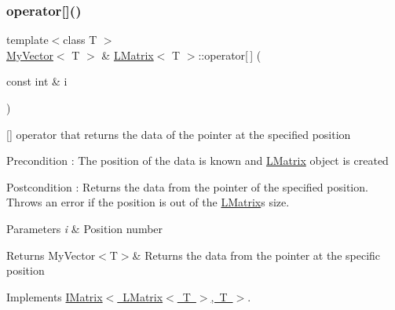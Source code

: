 \subsubsection{\texorpdfstring{operator[]()}{operator[]()}\hspace{0.1cm}{\footnotesize\ttfamily [1/2]}}
{\footnotesize\ttfamily template$<$class T $>$ \\
\mbox{\hyperlink{class_my_vector}{My\+Vector}}$<$ T $>$ \& \mbox{\hyperlink{class_l_matrix}{L\+Matrix}}$<$ T $>$\+::operator\mbox{[}$\,$\mbox{]} (\begin{DoxyParamCaption}\item[{const int \&}]{i }\end{DoxyParamCaption})\hspace{0.3cm}{\ttfamily [virtual]}}



\mbox{[}\mbox{]} operator that returns the data of the pointer at the specified position 

\begin{DoxyPrecond}{Precondition}
\+: The position of the data is known and \mbox{\hyperlink{class_l_matrix}{L\+Matrix}} object is created 
\end{DoxyPrecond}
\begin{DoxyPostcond}{Postcondition}
\+: Returns the data from the pointer of the specified position. Throws an error if the position is out of the \mbox{\hyperlink{class_l_matrix}{L\+Matrix}}\textquotesingle{}s size. 
\end{DoxyPostcond}

\begin{DoxyParams}{Parameters}
{\em i} & Position number \\
\hline
\end{DoxyParams}
\begin{DoxyReturn}{Returns}
My\+Vector$<$\+T$>$\& Returns the data from the pointer at the specific position 
\end{DoxyReturn}


Implements \mbox{\hyperlink{class_i_matrix_a3cfb2490e2849c6c19c1979066a64818}{I\+Matrix$<$ L\+Matrix$<$ T $>$, T $>$}}.

\mbox{\label{class_l_matrix_a56ec5ba9be0bb900ddc0ee7c5283bccd}} 
